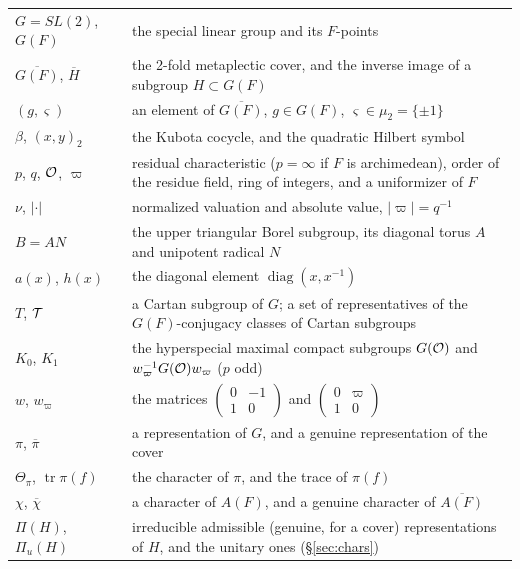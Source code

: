 \documentclass[12pt,letterpaper,openany]{book}
\theoremstyle{plain}
\theoremstyle{definition}
\theoremstyle{remark}
\theoremstyle{remark}
\newcommand{\tr}{\operatorname{tr}}
\begin{document}
\medskip
\begin{center}
\renewcommand{\arraystretch}{1.15}
\begin{tabular}{p{}p{}}
\hline
$G=SL(2)$, $G(F)$ & the special linear group and its $F$-points\\
$\overline{G(F)}$, $\overline{H}$ & the 2-fold metaplectic cover, and the
inverse image of a subgroup $H\subset G(F)$\\
$(g,\varsigma)$ & an element of $\overline{G(F)}$, $g\in G(F)$,
$\varsigma\in\mu_2=\{\pm1\}$\\
$\beta$, $(x,y)_2$ & the Kubota cocycle, and the quadratic Hilbert
symbol\\
$p$, $q$, ${\cal O}$, $\varpi$ & residual characteristic ($p=\infty$ if
$F$ is archimedean), order of the residue field, ring of integers, and a
uniformizer of $F$ \\
$\nu$, $|\cdot|$ & normalized valuation and absolute value,
$|\varpi|=q^{-1}$\\
$B=AN$ & the upper triangular Borel subgroup, its diagonal torus $A$ and
unipotent radical $N$\\
$a(x)$, $h(x)$ & the diagonal element $\operatorname{diag}(x,x^{-1})$\\
$T$, ${\cal T}$ & a Cartan subgroup of $G$; a set of representatives of
the $G(F)$-conjugacy classes of Cartan subgroups\\
$K_0$, $K_1$ & the hyperspecial maximal compact subgroups $G({\cal O})$
and $w_\varpi^{-1}G({\cal O})w_\varpi$ ($p$ odd)\\
$w$, $w_\varpi$ & the matrices $\left(\begin{smallmatrix}0&-1\\1&0\end{smallmatrix}\right)$ and
$\left(\begin{smallmatrix}0&\varpi\\1&0\end{smallmatrix}\right)$\\
$\pi$, $\overline{\pi}$ & a representation of $G$, and a genuine
representation of the cover\\
$\Theta_\pi$, $\tr\pi(f)$ & the character of $\pi$, and the trace of
$\pi(f)$\\
$\chi$, $\overline{\chi}$ & a character of $A(F)$, and a genuine
character of $\overline{A(F)}$\\
$\Pi(H)$, $\Pi_u(H)$ & irreducible admissible (genuine, for a cover)
representations of $H$, and the unitary ones (\S\ref{sec:chars})\\

\end{tabular}
\end{center}
\end{document}
